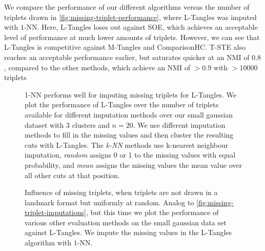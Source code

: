 We compare the performance of our different algorithms versus the number of triplets drawn in
\autoref{fig:missing-triplet-performance}, where L-Tangles was imputed with $1$-NN. Here, L-Tangles loses out against SOE, which achieves an acceptable level of performance at much lower amounts of triplets. 
However, we can see that L-Tangles is competitive against M-Tangles and ComparisonHC. T-STE also reaches an acceptable performance earlier, but saturates quicker at an NMI of $0.8$, compared to the other methods, which
achieve an NMI of $>0.9$ with $>10000$ triplets

\begin{figure}[ht]
    \centering
    \resizebox{0.7\textwidth}{!}{}
    \caption{
        1-NN performs well for imputing missing triplets for L-Tangles.
        We plot the performance of L-Tangles over the number of triplets available for different imputation methods over our small gaussian dataset with $3$ clusters
        and $n=20$. We use different imputation methods to fill in the missing values and then cluster the resulting cuts with L-Tangles.
        The \textit{k-NN} methods use k-nearest neighbour imputation, \textit{random} assigns 0 or 1 to the missing values with equal probability, and \textit{mean} assigns the missing
        values the mean value over all other cuts at that position.
    }
    \label{fig:missing-triplet-imputations}
\end{figure}

\begin{figure}[ht]
    \centering
    \resizebox{0.7\textwidth}{!}{}
    \caption{
        Influence of missing triplets, when triplets are not drawn in a landmark format but uniformly at random.
        Analog to \autoref{fig:missing-triplet-imputations}, but this time we plot the performance of various other evaluation methods on the small gaussian data set against L-Tangles.
        We impute the missing values in the L-Tangles algorithm with $1$-NN.
    }
    \label{fig:missing-triplet-performance}
\end{figure}



